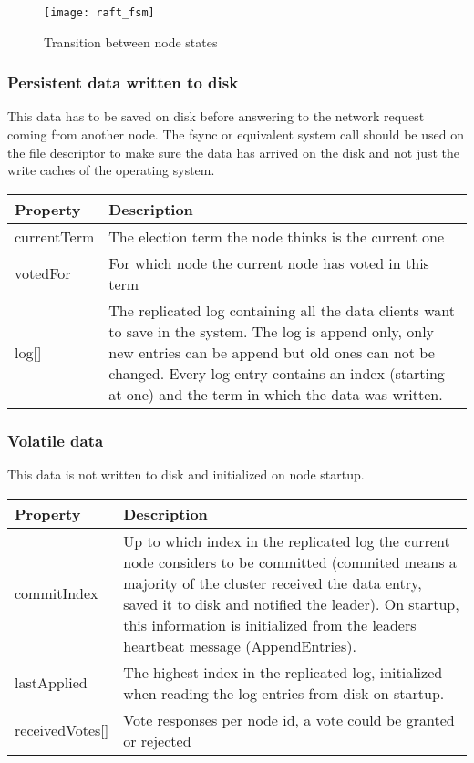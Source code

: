\begin{figure}
  \captionsetup{labelformat=empty}
  \caption{Transition between node states \cite{fuzzing_raft_for_fun_and_publication} }
  \centering
  \texttt{[image: raft\_fsm]}
  
\end{figure}




\subsubsection*{Persistent data written to disk}

This data has to be saved on disk before answering to the network request coming from another node. The fsync or equivalent system call should be used on the file descriptor to make sure the data has arrived on the disk and not just the write caches of the operating system.

\begin{tabularx}{\textwidth}{ | p{80px} | X | }
\hline
\textbf{Property} & \textbf{Description} \\ \hline
currentTerm & The election term the node thinks is the current one \\ \hline
votedFor & For which node the current node has voted in this term \\ \hline
log[] & The replicated log containing all the data clients want to save in the system. The log is append only, only new entries can be append but old ones can not be changed.
Every log entry contains an index (starting at one) and the term in which the data was written. \\ \hline
\end{tabularx}

\subsubsection*{Volatile data}

This data is not written to disk and initialized on node startup.

\begin{tabularx}{\textwidth}{ | p{80px} | X | }
\hline
\textbf{Property} & \textbf{Description} \\ \hline
commitIndex & Up to which index in the replicated log the current node considers to be committed (commited means a majority of the cluster
received the data entry, saved it to disk and notified the leader). On startup, this information is initialized from the leaders heartbeat message (AppendEntries). \\
\hline
lastApplied & The highest index in the replicated log, initialized when reading the log entries from disk on startup. \\
\hline
receivedVotes[] & Vote responses per node id, a vote could be granted or rejected \\
\hline
\end{tabularx}

